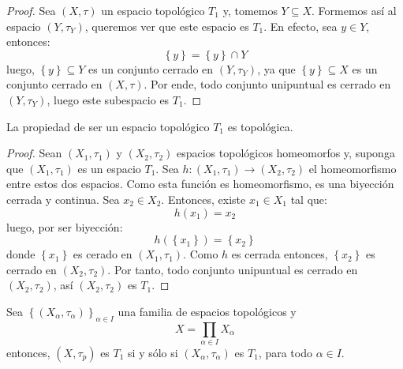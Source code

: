 \documentclass[12pt]{report}
\theoremstyle{largebreak}
\newcommand\cf[3]{\ensuremath{#1:#2\rightarrow#3}}
\begin{document}
    \begin{proof}
        Sea $(X,\tau)$ un espacio topológico $T_1$ y, tomemos $Y\subseteq X$. Formemos así al espacio $(Y,\tau_Y)$, queremos ver que este espacio es $T_1$. En efecto, sea $y\in Y$, entonces:
        \begin{equation*}
            \left\{y\right\}=\left\{y \right\}\cap Y
        \end{equation*}
        luego, $\left\{y\right\}\subseteq Y$ es un conjunto cerrado en $(Y,\tau_Y)$, ya que $\left\{y\right\}\subseteq X$ es un conjunto cerrado en $(X,\tau)$. Por ende, todo conjunto unipuntual es cerrado en $(Y,\tau_Y)$, luego este subespacio es $T_1$.
    \end{proof}

    \begin{propo}
        La propiedad de ser un espacio topológico $T_1$ es topológica.
    \end{propo}

    \begin{proof}
        Sean $(X_1,\tau_1)$ y $(X_2,\tau_2)$ espacios topológicos homeomorfos y, suponga que $(X_1,\tau_1)$ es un espacio $T_1$. Sea $\cf{h}{(X_1,\tau_1)}{(X_2,\tau_2)}$ el homeomorfismo entre estos dos espacios. Como esta función es homeomorfismo, es una biyección cerrada y continua. Sea $x_2\in X_2$. Entonces, existe $x_1\in X_1$ tal que:
        \begin{equation*}
            h(x_1)=x_2
        \end{equation*}
        luego, por ser biyección:
        \begin{equation*}
            h(\left\{x_1\right\})=\left\{x_2\right\}
        \end{equation*}
        donde $\left\{x_1\right\}$ es cerado en $(X_1,\tau_1)$. Como $h$ es cerrada entonces, $\left\{x_2\right\}$ es cerrado en $(X_2,\tau_2)$. Por tanto, todo conjunto unipuntual es cerrado en $(X_2,\tau_2)$, así $(X_2,\tau_2)$ es $T_1$. 
    \end{proof}

    \begin{propo}
        Sea $\left\{(X_\alpha,\tau_\alpha)\right\}_{\alpha\in I}$ una familia de espacios topológicos y
        \begin{equation*}
            X=\prod_{\alpha\in I}X_\alpha
        \end{equation*}
        entonces, $(X,\tau_p)$ es $T_1$ si y sólo si $(X_\alpha,\tau_\alpha)$ es $T_1$, para todo $\alpha\in I$.
    \end{propo}
\end{document}

